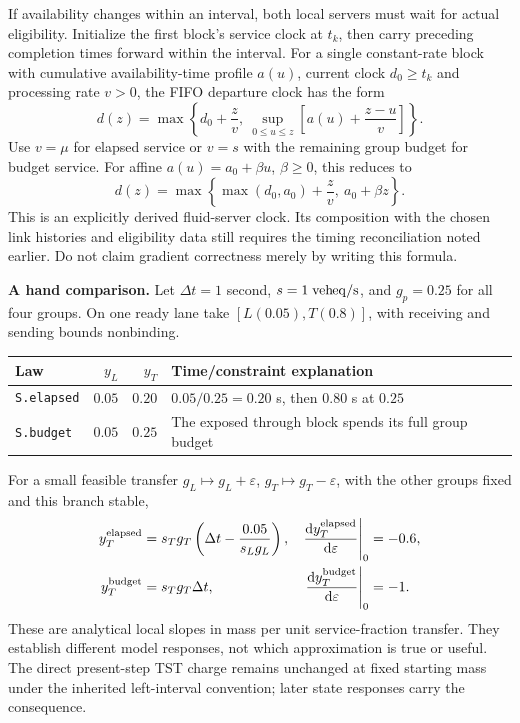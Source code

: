 \documentclass[11pt]{article}
\newcommand{\ve}{\mathrm{veh\!\!\;eq}}
\newcommand{\dd}{\mathrm d}
\begin{document}
If availability changes within an interval, both local servers must wait for actual eligibility. Initialize the first block's service clock at $t_k$, then carry preceding completion times forward within the interval. For a single constant-rate block with cumulative availability-time profile $a(u)$, current clock $d_0\ge t_k$ and processing rate $v>0$, the FIFO departure clock has the form
\begin{equation}
 d(z)=\max\left\{d_0+\frac zv,\
       \sup_{0\le u\le z}\left[a(u)+\frac{z-u}{v}\right]\right\}.
 \label{eq:clock}
\end{equation}
Use $v=\mu$ for elapsed service or $v=s$ with the remaining group budget for budget service. For affine $a(u)=a_0+\beta u$, $\beta\ge0$, this reduces to
\begin{equation}
 d(z)=\max\left\{\max(d_0,a_0)+\frac zv,\ a_0+\beta z\right\}.
\end{equation}
This is an explicitly derived fluid-server clock. Its composition with the chosen link histories and eligibility data still requires the timing reconciliation noted earlier. Do not claim gradient correctness merely by writing this formula.

\textbf{A hand comparison.} Let $\Delta t=1$ second, $s=1\;\ve/{\rm s}$, and $g_p=0.25$ for all four groups. On one ready lane take $[L(0.05),T(0.8)]$, with receiving and sending bounds nonbinding.
\begin{center}
\begin{tabular}{lrrl}\toprule
Law & $y_L$ & $y_T$ & Time/constraint explanation\\\midrule
\texttt{S.elapsed} & $0.05$ & $0.20$ & $0.05/0.25=0.20$ s, then $0.80$ s at $0.25$\\
\texttt{S.budget} & $0.05$ & $0.25$ & The exposed through block spends its full group budget\\\bottomrule
\end{tabular}
\end{center}
For a small feasible transfer $g_L\mapsto g_L+\varepsilon$, $g_T\mapsto g_T-\varepsilon$, with the other groups fixed and this branch stable,
\begin{align}
 y_T^{\rm elapsed}&=s_Tg_T\left(\Delta t-\frac{0.05}{s_Lg_L}\right),
 &\left.\frac{\dd y_T^{\rm elapsed}}{\dd\varepsilon}\right|_0&=-0.6,\\
 y_T^{\rm budget}&=s_Tg_T\Delta t,
 &\left.\frac{\dd y_T^{\rm budget}}{\dd\varepsilon}\right|_0&=-1.
\end{align}
These are analytical local slopes in mass per unit service-fraction transfer. They establish different model responses, not which approximation is true or useful. The direct present-step TST charge remains unchanged at fixed starting mass under the inherited left-interval convention; later state responses carry the consequence.
\end{document}
